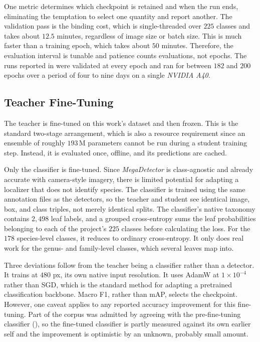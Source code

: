 One metric determines which checkpoint is retained and when the run ends, eliminating the temptation to select one quantity and report another. The validation pass is the binding cost, which is single-threaded over $225$ classes and takes about $12.5$ minutes, regardless of image size or batch size. This is much faster than a training epoch, which takes about $50$ minutes. Therefore, the evaluation interval is tunable and patience counts evaluations, not epochs.  %
The runs reported in  were validated at every epoch and ran for between $182$ and $200$ epochs over a period of four to nine days on a single \textit{NVIDIA A40}.

\subsection{Teacher Fine-Tuning}\label{sec:teacher_finetuning}

The teacher is fine-tuned on this work's dataset and then frozen. This is the standard two-stage arrangement, which is also a resource requirement since an ensemble of roughly $193\,\mathrm{M}$ parameters cannot be run during a student training step. Instead, it is evaluated once, offline, and its predictions are cached.

Only the classifier is fine-tuned. Since \textit{MegaDetector} is class-agnostic and already accurate with camera-style imagery, there is limited potential for adapting a localizer that does not identify species. The classifier is trained using the same annotation files as the detectors, so the teacher and student see identical image, box, and class triples, not merely identical splits. The classifier's native taxonomy contains $2{,}498$ leaf labels, and a grouped cross-entropy sums the leaf probabilities belonging to each of the project's $225$ classes before calculating the loss. For the $178$ species-level classes, it reduces to ordinary cross-entropy. It only does real work for the genus- and family-level classes, which several leaves map into.

Three deviations follow from the teacher being a classifier rather than a detector. It trains at $480$ px, its own native input resolution. It uses AdamW at $1 \times 10^{-4}$ rather than SGD, which is the standard method for adapting a pretrained classification backbone. Macro F1, rather than mAP, selects the checkpoint. However, one caveat applies to any reported accuracy improvement for this fine-tuning. Part of the corpus was admitted by agreeing with the pre-fine-tuning classifier (), so the fine-tuned classifier is partly measured against its own earlier self and the improvement is optimistic by an unknown, probably small amount.

